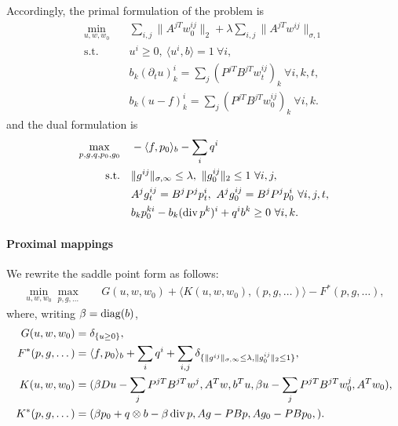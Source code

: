 Accordingly, the primal formulation of the problem is
\begin{align*}
    \min_{u,w,w_0} \quad
        & \sum_{i,j} \| A^{jT} w_0^{ij} \|_{2}
            + \lambda \sum_{i,j} \| A^{jT} w^{ij} \|_{\sigma,1} \\
    \text{s.t.}\quad 
        & u^i \geq 0, ~\langle u^i, b \rangle = 1 ~\forall i, \\
        & b_k (\partial_t u)_k^i = \sum_j (P^{jT}B^{jT}w^{ij}_t)_{k} ~\forall i,k,t, \\
        & b_k (u - f)_k^i = \sum_j (P^{jT}B^{jT}w_0^{ij})_{k} ~\forall i,k.
\end{align*}
and the dual formulation is
\begin{align*}
    \max_{p,g,q,p_0,g_0} \quad
        & - \langle f, p_0 \rangle_b - \sum_i q^i \\
    \text{s.t.}\quad 
        & \|g^{ij}\|_{\sigma,\infty} \leq \lambda,~ 
          \|g_0^{ij}\|_{2} \leq 1 ~\forall i,j, \\
        & A^j g^{ij}_t = B^j P^j p^i_t,~
          A^j g_0^{ij} = B^j P^j p_0^i ~\forall i,j,t, \\
        & b_k p_0^{ki} - b_k (\operatorname{div} p^k)^i + q^i b^k \geq 0 ~\forall i, k.
\end{align*}

\paragraph{Proximal mappings}

We rewrite the saddle point form as follows:
\begin{align*}
    \min_{u,w,w_0} \max_{p,g,\dots} \quad
        & G(u,w,w_0)
          + \langle K(u,w,w_0), (p,g,\dots) \rangle
          - F^*(p,g,\dots),
\end{align*}
where, writing $\beta = \operatorname{diag}(b)$,
\begin{align*}
    G(u,w,w_0) &= \delta_{\{u \geq 0\}}, \\
    F^*(p,g,\dots) &= \langle f, p_0 \rangle_b + \sum_{i} q^i 
        + \sum_{i,j} \delta_{\{
            \|g^{ij}\|_{\sigma,\infty} \leq \lambda,
            \|g_0^{ij}\|_{2} \leq 1
        \}}, \\
    K(u,w,w_0) &= (
        \beta Du - \sum_j P^{jT}B^{jT}w^{j},
        A^T w,
        b^T u,
        \beta u - \sum_j P^{jT}B^{jT}w_0^{j},
        A^T w_0
    ), \\
    K^*(p,g,\dots) &= (
        \beta p_0 + q \otimes b - \beta \operatorname{div}{p},
        A g - PBp,
        A g_0 - PB p_0,
    ).
\end{align*}

